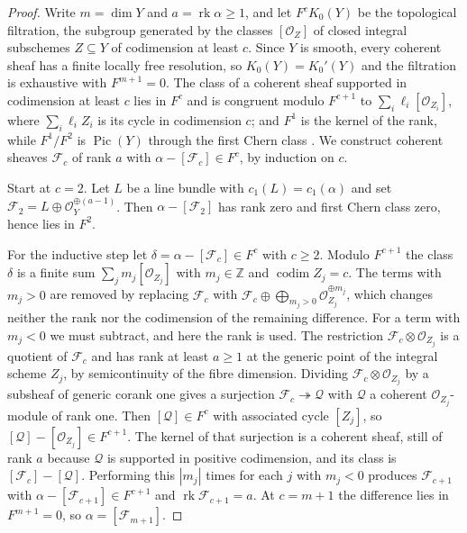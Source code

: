 \documentclass[11pt,reqno]{amsart}
\theoremstyle{plain}
\theoremstyle{definition}
\theoremstyle{remark}
\newcommand{\ZZ}{\mathbb{Z}}
\newcommand{\cF}{\mathcal{F}}
\newcommand{\cO}{\mathcal{O}}
\newcommand{\cQ}{\mathcal{Q}}
\DeclareMathOperator{\rk}{rk}
\DeclareMathOperator{\Pic}{Pic}
\DeclareMathOperator{\codim}{codim}
\begin{document}
\begin{proof}
Write $m=\dim Y$ and $a=\rk\alpha\ge1$, and let $F^{c}K_{0}(Y)$ be the
topological filtration, the subgroup generated by the classes $[\cO_{Z}]$ of
closed integral subschemes $Z\subseteq Y$ of codimension at least $c$. Since
$Y$ is smooth, every coherent sheaf has a finite locally free resolution, so
$K_{0}(Y)=K_{0}'(Y)$ and the filtration is exhaustive with $F^{m+1}=0$.
The class of a coherent sheaf supported in codimension at least $c$
lies in $F^{c}$ and is congruent modulo $F^{c+1}$ to
$\sum_{i}\ell_{i}[\cO_{Z_{i}}]$, where $\sum_{i}\ell_{i}Z_{i}$ is its cycle in
codimension $c$; and $F^{1}$ is the kernel of the rank, while $F^{1}/F^{2}$ is
$\Pic(Y)$ through the first Chern class \cite[\S 15.1 and
Ex.~15.1.5]{Ful98}. We construct coherent
sheaves $\cF_{c}$ of rank $a$ with $\alpha-[\cF_{c}]\in F^{c}$, by induction on
$c$.

Start at $c=2$. Let $L$ be a line bundle with $c_{1}(L)=c_{1}(\alpha)$ and set
$\cF_{2}=L\oplus\cO_{Y}^{\oplus(a-1)}$. Then $\alpha-[\cF_{2}]$ has rank zero
and first Chern class zero, hence lies in $F^{2}$.

For the inductive step let $\delta=\alpha-[\cF_{c}]\in F^{c}$ with $c\ge2$.
Modulo $F^{c+1}$ the class $\delta$ is a finite sum $\sum_{j}m_{j}
[\cO_{Z_{j}}]$ with $m_{j}\in\ZZ$ and $\codim Z_{j}=c$. The terms with
$m_{j}>0$ are removed by replacing $\cF_{c}$ with $\cF_{c}\oplus\bigoplus_{
m_{j}>0}\cO_{Z_{j}}^{\oplus m_{j}}$, which changes neither the rank nor the
codimension of the remaining difference. For a term with $m_{j}<0$ we must
subtract, and here the rank is used. The restriction $\cF_{c}\otimes
\cO_{Z_{j}}$ is a quotient of $\cF_{c}$ and has rank at least $a\ge1$ at the
generic point of the integral scheme $Z_{j}$, by semicontinuity of the fibre
dimension. Dividing $\cF_{c}\otimes\cO_{Z_{j}}$ by a subsheaf of generic
corank one gives a surjection $\cF_{c}\twoheadrightarrow\cQ$ with $\cQ$ a
coherent $\cO_{Z_{j}}$-module of rank one. Then $[\cQ]\in F^{c}$ with
associated cycle $[Z_{j}]$, so $[\cQ]-[\cO_{Z_{j}}]\in F^{c+1}$. The kernel of
that surjection is a coherent sheaf, still of rank $a$ because $\cQ$ is
supported in positive codimension, and its class is $[\cF_{c}]-[\cQ]$.
Performing this $|m_{j}|$ times for each $j$ with $m_{j}<0$ produces
$\cF_{c+1}$ with $\alpha-[\cF_{c+1}]\in F^{c+1}$ and $\rk\cF_{c+1}=a$. At
$c=m+1$ the difference lies in $F^{m+1}=0$, so $\alpha=[\cF_{m+1}]$.
\end{proof}
\end{document}
